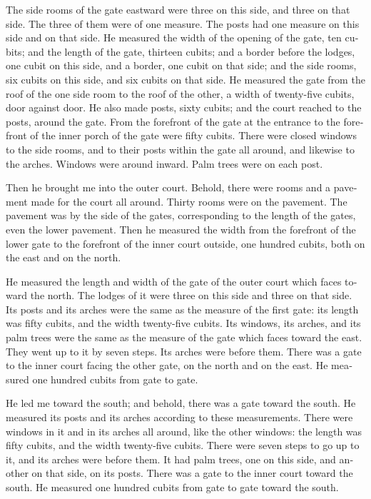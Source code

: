 \begin{paracol}{2}
\begin{otherlanguage}{english}
 The side rooms of the gate eastward were three on this
side, and three on that side. The three of them were of one measure. The
posts had one measure on this side and on that side.  He
measured the width of the opening of the gate, ten cubits; and the
length of the gate, thirteen cubits;  and a border before
the lodges, one cubit on this side, and a border, one cubit on that
side; and the side rooms, six cubits on this side, and six cubits on
that side.  He measured the gate from the roof of the one
side room to the roof of the other, a width of twenty-five cubits, door
against door.  He also made posts, sixty cubits; and the
court reached to the posts, around the gate.  From the
forefront of the gate at the entrance to the forefront of the inner
porch of the gate were fifty cubits.  There were closed
windows to the side rooms, and to their posts within the gate all
around, and likewise to the arches. Windows were around inward. Palm
trees were on each post.

 Then he brought me into the outer court. Behold, there
were rooms and a pavement made for the court all around. Thirty rooms
were on the pavement.  The pavement was by the side of
the gates, corresponding to the length of the gates, even the lower
pavement.  Then he measured the width from the forefront
of the lower gate to the forefront of the inner court outside, one
hundred cubits, both on the east and on the north.

 He measured the length and width of the gate of the
outer court which faces toward the north.  The lodges of
it were three on this side and three on that side. Its posts and its
arches were the same as the measure of the first gate: its length was
fifty cubits, and the width twenty-five cubits.  Its
windows, its arches, and its palm trees were the same as the measure of
the gate which faces toward the east. They went up to it by seven steps.
Its arches were before them.  There was a gate to the
inner court facing the other gate, on the north and on the east. He
measured one hundred cubits from gate to gate.

 He led me toward the south; and behold, there was a gate
toward the south. He measured its posts and its arches according to
these measurements.  There were windows in it and in its
arches all around, like the other windows: the length was fifty cubits,
and the width twenty-five cubits.  There were seven steps
to go up to it, and its arches were before them. It had palm trees, one
on this side, and another on that side, on its posts. 
There was a gate to the inner court toward the south. He measured one
hundred cubits from gate to gate toward the south.


\end{otherlanguage}
\end{paracol}
